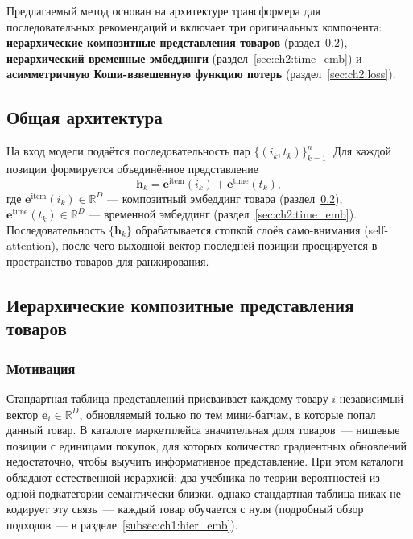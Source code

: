 Предлагаемый метод основан на архитектуре трансформера для последовательных рекомендаций и включает
три оригинальных компонента: \textbf{иерархические композитные представления товаров}
(раздел~\ref{sec:ch2:composite}), \textbf{иерархический временные эмбеддинги}
(раздел~\ref{sec:ch2:time_emb}) и \textbf{асимметричную Коши-взвешенную функцию потерь}
(раздел~\ref{sec:ch2:loss}).

\subsection{Общая архитектура}
\label{sec:ch2:arch}

На вход модели подаётся последовательность пар $\{(i_k, t_k)\}_{k=1}^{n}$.
Для каждой позиции формируется объединённое представление
\begin{equation}
  \mathbf{h}_k = \mathbf{e}^{\mathrm{item}}(i_k) + \mathbf{e}^{\mathrm{time}}(t_k),
\end{equation}
где $\mathbf{e}^{\mathrm{item}}(i_k) \in \mathbb{R}^D$ --- композитный эмбеддинг товара
(раздел~\ref{sec:ch2:composite}), $\mathbf{e}^{\mathrm{time}}(t_k) \in \mathbb{R}^D$ ---
временной эмбеддинг (раздел~\ref{sec:ch2:time_emb}).
Последовательность $\{\mathbf{h}_k\}$ обрабатывается стопкой слоёв само-внимания
(self-attention), после чего выходной вектор последней позиции проецируется в пространство товаров
для ранжирования.

\subsection{Иерархические композитные представления товаров}
\label{sec:ch2:composite}

\subsubsection{Мотивация}

Стандартная таблица представлений присваивает каждому товару $i$ независимый вектор
$\mathbf{e}_i \in \mathbb{R}^D$, обновляемый только по тем мини-батчам, в которые попал данный
товар. В каталоге маркетплейса значительная доля товаров~--- нишевые позиции с единицами покупок,
для которых количество градиентных обновлений недостаточно, чтобы выучить информативное
представление. При этом каталоги обладают естественной иерархией: два учебника по теории
вероятностей из одной подкатегории семантически близки, однако стандартная таблица никак не
кодирует эту связь~--- каждый товар обучается с нуля
(подробный обзор подходов~--- в разделе~\ref{subsec:ch1:hier_emb}).

